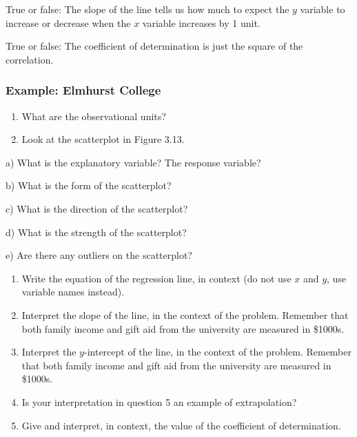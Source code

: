 \documentclass[
]{report}
\newcommand{\rgs}{\vspace{12pt}} %
\newcommand{\rgi}{\hspace{24pt}}  %
\begin{document}
True or false: The slope of the line tells us how much to expect the \(y\) variable to increase or decrease when the \(x\) variable increases by 1 unit.

True or false: The coefficient of determination is just the square of the correlation.

\hypertarget{example-elmhurst-college}{%
\subsubsection*{Example: Elmhurst College}\label{example-elmhurst-college}}

\begin{enumerate}
\def\labelenumi{\arabic{enumi}.}
\item
  What are the observational units?\\
  \rgs
\item
  Look at the scatterplot in Figure 3.13.
\end{enumerate}

\rgi a) What is the explanatory variable? The response variable?\\
\rgs

\rgi b) What is the form of the scatterplot?\\
\rgs

\rgi c) What is the direction of the scatterplot?
\rgs

\rgi d) What is the strength of the scatterplot?
\rgs

\rgi e) Are there any outliers on the scatterplot?\\
\rgs

\begin{enumerate}
\def\labelenumi{\arabic{enumi}.}
\setcounter{enumi}{2}
\item
  Write the equation of the regression line, in context (do not use \(x\) and \(y\), use variable names instead).
  \rgs
\item
  Interpret the slope of the line, in the context of the problem. Remember that both family income and gift aid from the university are measured in \$1000s.
  \rgs
  \rgs
\item
  Interpret the \(y\)-intercept of the line, in the context of the problem. Remember that both family income and gift aid from the university are measured in \$1000s.
  \rgs
  \rgs
\item
  Is your interpretation in question 5 an example of extrapolation?
  \rgs
\item
  Give and interpret, in context, the value of the coefficient of determination.
  \rgs
  \rgs
\end{enumerate}
\end{document}
